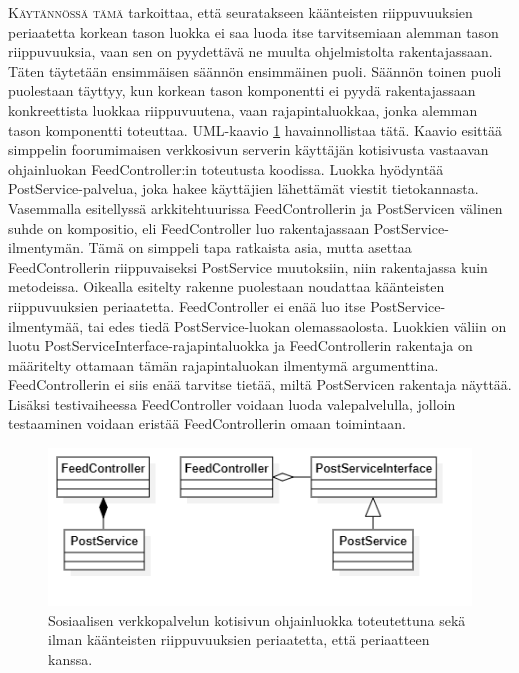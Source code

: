 \documentclass[openany]{book}
\newcommand{\newthought}[1]{\smallskip\textsc{#1}}
\begin{document}
\newthought{Käytännössä tämä} tarkoittaa, että seuratakseen käänteisten riippuvuuksien periaatetta
korkean tason luokka ei saa luoda itse tarvitsemiaan alemman tason riippuvuuksia, vaan sen on
pyydettävä ne muulta ohjelmistolta rakentajassaan. Täten täytetään ensimmäisen säännön ensimmäinen
puoli. Säännön toinen puoli puolestaan täyttyy, kun korkean tason komponentti ei pyydä
rakentajassaan konkreettista luokkaa riippuvuutena, vaan rajapintaluokkaa, jonka alemman tason
komponentti toteuttaa. \gls{UML}-kaavio \ref{DIPUML} havainnollistaa tätä. Kaavio esittää
simppelin foorumimaisen verkkosivun serverin käyttäjän kotisivusta vastaavan ohjainluokan
FeedController:in toteutusta koodissa. Luokka hyödyntää PostService-palvelua, joka hakee
käyttäjien lähettämät viestit tietokannasta. Vasemmalla esitellyssä arkkitehtuurissa
FeedControllerin ja PostServicen välinen suhde on \gls{kompositio}, eli FeedController luo
rakentajassaan PostService-ilmentymän. Tämä on simppeli tapa ratkaista asia, mutta asettaa
FeedControllerin riippuvaiseksi PostService muutoksiin, niin rakentajassa kuin metodeissa.
Oikealla esitelty rakenne puolestaan noudattaa käänteisten riippuvuuksien periaatetta.
FeedController ei enää luo itse PostService-ilmentymää, tai edes tiedä PostService-luokan
olemassaolosta. Luokkien väliin on luotu PostServiceInterface-rajapintaluokka ja FeedControllerin
rakentaja on määritelty ottamaan tämän rajapintaluokan ilmentymä argumenttina. FeedControllerin ei
siis enää tarvitse tietää, miltä PostServicen rakentaja näyttää. Lisäksi testivaiheessa
FeedController voidaan luoda valepalvelulla, jolloin testaaminen voidaan eristää FeedControllerin
omaan toimintaan.

\begin{figure}
    \includegraphics{CombinedDIPExample}
    \caption{Sosiaalisen verkkopalvelun kotisivun ohjainluokka toteutettuna sekä ilman käänteisten riippuvuuksien periaatetta, että periaatteen kanssa.}
    \label{DIPUML}
\end{figure}
\end{document}
